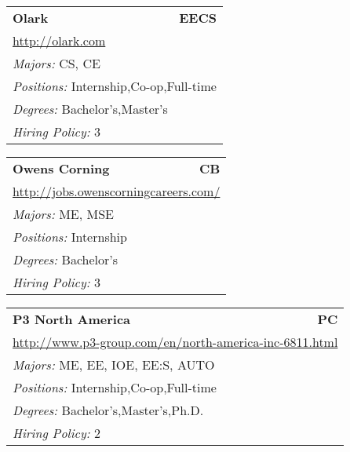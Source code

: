\documentclass[twoside]{article}
\begin{document}
\begin{center}
\begin{multicols}{3}
\begin{FlushLeft}
\begin{minipage}{.9\columnwidth}
\end{minipage}
 
\begin{minipage}{.9\columnwidth}\begin{tabularx}{.95\columnwidth}{Xr}
                 {\Large\bf Olark} & {\Large\bf EECS}\\
    \multicolumn{2}{p{.95\columnwidth}}{\url{http://olark.com}}\\
    \multicolumn{2}{p{.95\columnwidth}}{\emph{Majors:} CS, CE}\\
    \multicolumn{2}{p{.95\columnwidth}}{\emph{Positions:} Internship,Co-op,Full-time}\\
    \multicolumn{2}{p{.95\columnwidth}}{\emph{Degrees:} Bachelor's,Master's}\\
    \multicolumn{2}{p{.95\columnwidth}}{\emph{Hiring Policy:} 3}\\
    \end{tabularx}
    
\end{minipage}
 
\begin{minipage}{.9\columnwidth}\begin{tabularx}{.95\columnwidth}{Xr}
                 {\Large\bf Owens Corning} & {\Large\bf CB}\\
    \multicolumn{2}{p{.95\columnwidth}}{\url{http://jobs.owenscorningcareers.com/}}\\
    \multicolumn{2}{p{.95\columnwidth}}{\emph{Majors:} ME, MSE}\\
    \multicolumn{2}{p{.95\columnwidth}}{\emph{Positions:} Internship}\\
    \multicolumn{2}{p{.95\columnwidth}}{\emph{Degrees:} Bachelor's}\\
    \multicolumn{2}{p{.95\columnwidth}}{\emph{Hiring Policy:} 3}\\
    \end{tabularx}
    
\end{minipage}
 
\begin{minipage}{.9\columnwidth}\begin{tabularx}{.95\columnwidth}{Xr}
                 {\Large\bf P3 North America} & {\Large\bf PC}\\
    \multicolumn{2}{p{.95\columnwidth}}{\url{http://www.p3-group.com/en/north-america-inc-6811.html}}\\
    \multicolumn{2}{p{.95\columnwidth}}{\emph{Majors:} ME, EE, IOE, EE:S, AUTO}\\
    \multicolumn{2}{p{.95\columnwidth}}{\emph{Positions:} Internship,Co-op,Full-time}\\
    \multicolumn{2}{p{.95\columnwidth}}{\emph{Degrees:} Bachelor's,Master's,Ph.D.}\\
    \multicolumn{2}{p{.95\columnwidth}}{\emph{Hiring Policy:} 2}\\
    \end{tabularx}
    

\end{minipage}
\end{FlushLeft}
\end{multicols}
\end{center}
\end{document}
